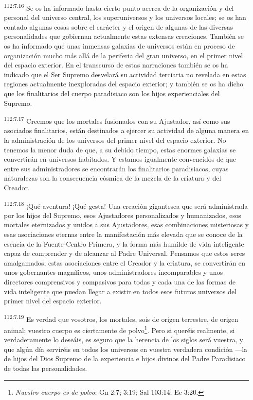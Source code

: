 \documentclass[twoside, 11pt]{book}
\begin{document}
\par
\textsuperscript{112:7.16} Se os ha informado hasta cierto punto acerca de la organización y del personal del universo central, los superuniversos y los universos locales; se os han contado algunas cosas sobre el carácter y el origen de algunas de las diversas personalidades que gobiernan actualmente estas extensas creaciones. También se os ha informado que unas inmensas galaxias de universos están en proceso de organización mucho más allá de la periferia del gran universo, en el primer nivel del espacio exterior. En el transcurso de estas narraciones también se os ha indicado que el Ser Supremo desvelará su actividad terciaria no revelada en estas regiones actualmente inexploradas del espacio exterior; y también se os ha dicho que los finalitarios del cuerpo paradisiaco son los hijos experienciales del Supremo.

\par
\textsuperscript{112:7.17} Creemos que los mortales fusionados con su Ajustador, así como sus asociados finalitarios, están destinados a ejercer su actividad de alguna manera en la administración de los universos del primer nivel del espacio exterior. No tenemos la menor duda de que, a su debido tiempo, estas enormes galaxias se convertirán en universos habitados. Y estamos igualmente convencidos de que entre sus administradores se encontrarán los finalitarios paradisiacos, cuyas naturalezas son la consecuencia cósmica de la mezcla de la criatura y del Creador.

\par
\textsuperscript{112:7.18} ¡Qué aventura! ¡Qué gesta! Una creación gigantesca que será administrada por los hijos del Supremo, esos Ajustadores personalizados y humanizados, esos mortales eternizados y unidos a sus Ajustadores, esas combinaciones misteriosas y esas asociaciones eternas entre la manifestación más elevada que se conoce de la esencia de la Fuente-Centro Primera, y la forma más humilde de vida inteligente capaz de comprender y de alcanzar al Padre Universal. Pensamos que estos seres amalgamados, estas asociaciones entre el Creador y la criatura, se convertirán en unos gobernantes magníficos, unos administradores incomparables y unos directores comprensivos y compasivos para todas y cada una de las formas de vida inteligente que puedan llegar a existir en todos esos futuros universos del primer nivel del espacio exterior.

\par
\textsuperscript{112:7.19} Es verdad que vosotros, los mortales, sois de origen terrestre, de origen animal; vuestro cuerpo es ciertamente de polvo\footnote{\textit{Nuestro cuerpo es de polvo}: Gn 2:7; 3:19; Sal 103:14; Ec 3:20.}. Pero si queréis realmente, si verdaderamente lo deseáis, es seguro que la herencia de los siglos será vuestra, y que algún día serviréis en todos los universos en vuestra verdadera condición ---la de hijos del Dios Supremo de la experiencia e hijos divinos del Padre Paradisiaco de todas las personalidades.
\end{document}
